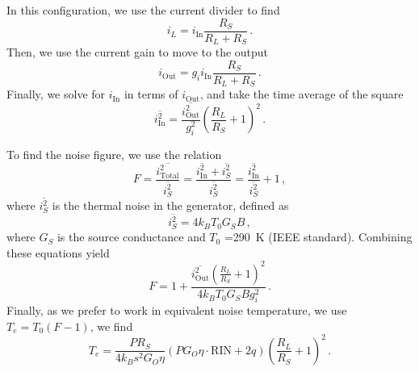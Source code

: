 In this configuration, we use the current divider to find
\begin{equation}
    i_L = i_\text{In}\frac{R_S}{R_L+R_S} \,.
\end{equation}
Then, we use the current gain to move to the output
\begin{equation}
    i_\text{Out} = g_ii_\text{In}\frac{R_S}{R_L+R_S} \,.
\end{equation}
Finally, we solve for $i_\text{In}$ in terms of $i_\text{Out}$, and take the time average of the square
\begin{equation}
    \overline{i_\text{In}^2} = \frac{\overline{i_\text{Out}^2}}{g_i^2}\left(\frac{R_L}{R_S}+1\right)^2 \,.
\end{equation}

To find the noise figure, we use the relation
\begin{equation}
    F = \frac{\overline{i_\text{Total}^2}}{\overline{i_S^2}} = \frac{\overline{i_\text{In}^2} + \overline{i_S^2}}{\overline{i_S^2}} = \frac{\overline{i_\text{In}^2}}{\overline{i_S^2}} + 1 \,,
\end{equation}
where $\overline{i_S^2}$ is the thermal noise in the generator, defined as
\begin{equation}
    \overline{i_S^2} = 4k_BT_0G_SB \,,
\end{equation}
where $G_S$ is the source conductance and $T_0$ \qty{=290}{\K} (IEEE standard).
Combining these equations yield
\begin{equation}
    F = 1 + \frac{\overline{i_\text{Out}^2}\left(\frac{R_L}{R_S}+1\right)^2}{4k_BT_0G_SBg_i^2} \,.
\end{equation}
Finally, as we prefer to work in equivalent noise temperature, we use $T_e = T_0(F-1)$, we find
\begin{equation}
    T_e  = \frac{PR_S}{4k_Bs^2G_O\eta}\left(PG_O\eta\cdot\text{RIN} + 2q\right)\left(\frac{R_L}{R_S}+1\right)^2 \,.
    \label{eq:link_noise}
\end{equation}


